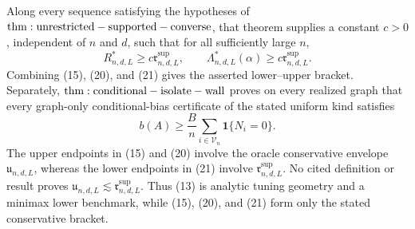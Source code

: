 Along every sequence satisfying the hypotheses of \({\rm thm:unrestricted-supported-converse}\), that theorem supplies a constant \(c>0\), independent of \(n\) and \(d\), such that for all sufficiently large \(n\),
\[
 R^*_{n,d,L}\geq c\mathfrak r^{\mathrm{sup}}_{n,d,L},
 \qquad
 \Lambda^*_{n,d,L}(\alpha)
 \geq c\mathfrak r^{\mathrm{sup}}_{n,d,L}.
\tag{21}
\]
Combining (15), (20), and (21) gives the asserted lower--upper bracket.  Separately, \({\rm thm:conditional-isolate-wall}\) proves on every realized graph that every graph-only conditional-bias certificate of the stated uniform kind satisfies
\[
 b(A)\geq\frac{B}{n}
 \sum_{i\in\mathcal V_n}\mathbf1\{N_i=0\}.
\tag{22}
\]
The upper endpoints in (15) and (20) involve the oracle conservative envelope \(\mathfrak u_{n,d,L}\), whereas the lower endpoints in (21) involve \(\mathfrak r^{\mathrm{sup}}_{n,d,L}\).  No cited definition or result proves \(\mathfrak u_{n,d,L}\lesssim\mathfrak r^{\mathrm{sup}}_{n,d,L}\).  Thus (13) is analytic tuning geometry and a minimax lower benchmark, while (15), (20), and (21) form only the stated conservative bracket.